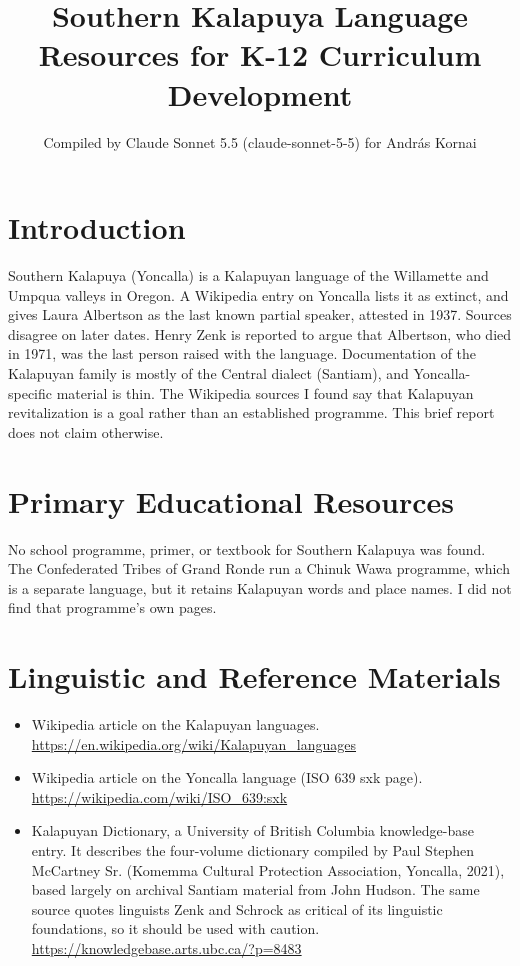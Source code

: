 \documentclass[12pt]{article}
\title{Southern Kalapuya Language Resources for K-12 Curriculum Development}
\author{Compiled by Claude Sonnet 5.5 (claude-sonnet-5-5) for Andr\'as Kornai}
\date{}
\begin{document}
\maketitle

\section{Introduction}
Southern Kalapuya (Yoncalla) is a Kalapuyan language of the Willamette and Umpqua valleys in Oregon. A Wikipedia entry on Yoncalla lists it as extinct, and gives Laura Albertson as the last known partial speaker, attested in 1937. Sources disagree on later dates. Henry Zenk is reported to argue that Albertson, who died in 1971, was the last person raised with the language. Documentation of the Kalapuyan family is mostly of the Central dialect (Santiam), and Yoncalla-specific material is thin. The Wikipedia sources I found say that Kalapuyan revitalization is a goal rather than an established programme. This brief report does not claim otherwise.

\section{Primary Educational Resources}
No school programme, primer, or textbook for Southern Kalapuya was found. The Confederated Tribes of Grand Ronde run a Chinuk Wawa programme, which is a separate language, but it retains Kalapuyan words and place names. I did not find that programme's own pages.

\section{Linguistic and Reference Materials}
\begin{itemize}
\item Wikipedia article on the Kalapuyan languages. \url{https://en.wikipedia.org/wiki/Kalapuyan_languages}
\item Wikipedia article on the Yoncalla language (ISO 639 sxk page). \url{https://wikipedia.com/wiki/ISO_639:sxk}
\item Kalapuyan Dictionary, a University of British Columbia knowledge-base entry. It describes the four-volume dictionary compiled by Paul Stephen McCartney Sr. (Komemma Cultural Protection Association, Yoncalla, 2021), based largely on archival Santiam material from John Hudson. The same source quotes linguists Zenk and Schrock as critical of its linguistic foundations, so it should be used with caution. \url{https://knowledgebase.arts.ubc.ca/?p=8483}
\end{itemize}
\end{document}
